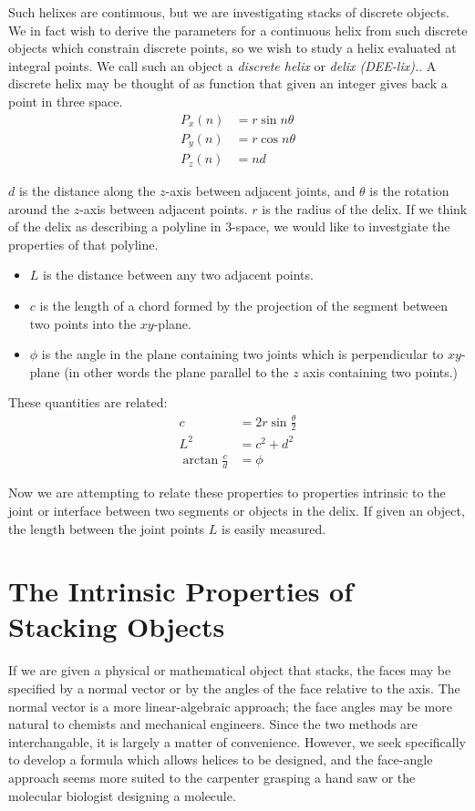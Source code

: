 \documentclass[11pt]{article}
\begin{document}
Such helixes are continuous, but we are investigating stacks of discrete objects. We in fact wish to derive
the parameters for a continuous helix from such discrete objects which constrain discrete points, so we wish
to study a helix evaluated at integral points. We call such an object a {\em discrete helix} or {\em delix (DEE-lix).}.
A discrete helix may be thought of as function that given an integer gives back a point in three space.
\begin{align*}
    P_x(n) &= r \sin{n \theta}  \\
    P_y(n) &= r \cos{n \theta} \\
   P_z(n) &= n d
\end{align*}

$d$ is the distance along the $z$-axis between adjacent joints, and $\theta$ is the rotation around the $z$-axis between adjacent points. $r$ is the radius of the delix. If we think of the delix as describing a polyline in 3-space, we would like to investgiate
the properties of that polyline.

\begin{itemize}
\item $L$ is the distance between any two adjacent points.
\item $c$ is the length of a chord formed by the projection of the segment between two points into the $xy$-plane.
\item $\phi$ is the angle in the plane containing two joints which is perpendicular to $xy$-plane
  (in other words the plane parallel to the $z$ axis containing two points.)
  \end{itemize}
These quantities are related:
\begin{align}
    c &= 2r\sin{\frac{\theta}{2}} \\
    L^2 &= c^2+d^2  \\
    \arctan{\frac{c}{d}}  &= \phi 
\end{align}

Now we are attempting to relate these properties to properties intrinsic to the joint or interface between
two segments or objects in the delix. If given an object, the length between the joint points $L$ is
easily measured.

\section{The Intrinsic Properties of Stacking Objects}

If we are given a physical or mathematical object that stacks,
the faces may be specified by a normal vector or by the
angles of the face relative to the axis. The normal vector
is a more linear-algebraic approach; the face angles may be more
natural to chemists and mechanical engineers. Since
the two methods are interchangable, it is largely a matter of
convenience. However, we seek specifically to develop a formula
which allows helices to be designed, and the face-angle approach
seems more suited to the carpenter grasping a hand saw or the
molecular biologist designing a molecule.
\end{document}
